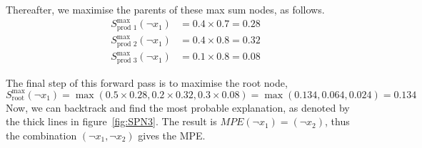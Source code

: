 \documentclass{article}
\begin{document}
\noindent Thereafter, we maximise the parents of these max sum nodes, as follows.
\begin{align*}
    S_{\text{prod 1}}^{\max}(\neg x_1) &= 0.4 \times 0.7 = 0.28\\
    S_{\text{prod 2}}^{\max}(\neg x_1) &= 0.4 \times 0.8 = 0.32\\
    S_{\text{prod 3}}^{\max}(\neg x_1) &= 0.1 \times 0.8 = 0.08
\end{align*}

\noindent The final step of this forward pass is to maximise the root node, 
$$
    S_{\text{root}}^{\max}(\neg x_1) = \max(0.5 \times 0.28, 0.2 \times 0.32, 0.3 \times 0.08) = \max(0.134, 0.064, 0.024) = 0.134
$$
\noindent Now, we can backtrack and find the most probable explanation, as denoted by the thick lines in figure~\ref{fig:SPN3}. The result is $MPE(\neg x_1) = (\neg x_2)$, thus the combination $(\neg x_1, \neg x_2)$ gives the MPE. 
\end{document}
